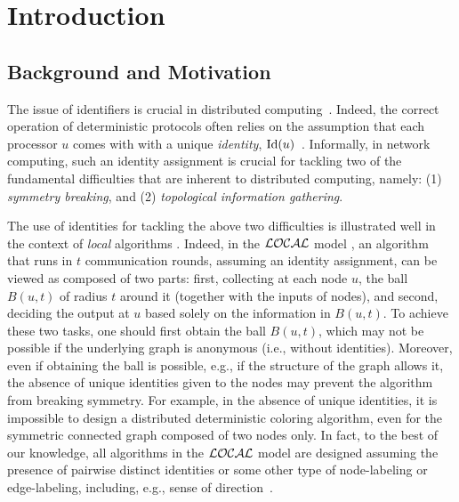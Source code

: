 \documentclass{llncs}
\newcommand{\id}{\mbox{\rm Id}}
\begin{document}
\section{Introduction}


\subsection{Background and Motivation}

The issue of identifiers is crucial in distributed computing~\cite{A80,NS93}. Indeed, the  correct operation of deterministic protocols often relies on the assumption that each processor $u$ comes with with a unique \emph{identity}, $\id(u)$~\cite{GHS}. Informally, in network computing, such an identity assignment is crucial for tackling two of the fundamental difficulties that are inherent to  distributed computing, namely: (1) {\em symmetry breaking}, and  (2)  {\em topological information gathering}. 

The use of identities for tackling the above two difficulties is illustrated well in the context of \emph{local} algorithms \cite{L92,L86}. Indeed, in the $\cal{LOCAL}$ model \cite{PelB00}, an algorithm that runs in $t$ communication rounds, assuming an identity assignment, can be viewed as composed of two parts: first, collecting at each node $u$, the ball $B(u,t)$ of radius $t$ around it (together with the inputs of nodes), and second, deciding the output at $u$   based solely on the information in $B(u,t)$. To achieve these two tasks, one should first obtain the ball $B(u,t)$, which may not be possible if the underlying graph is anonymous (i.e., without identities). Moreover, even if obtaining the ball is possible, e.g., if the structure of the graph allows it, the absence of unique identities  given to the nodes may prevent the algorithm from breaking symmetry. For example, in the absence of unique identities, it is impossible to design a distributed deterministic coloring algorithm, even for the symmetric connected graph composed of two nodes only.  In fact, to the best of our knowledge, all algorithms in the $\cal{LOCAL}$ model are designed assuming the presence of pairwise distinct identities or some other type of node-labeling or edge-labeling, including, e.g., sense of direction~\cite{BM09,HKP01,K09,LPR09,NS93,PS96}. 
\end{document}
